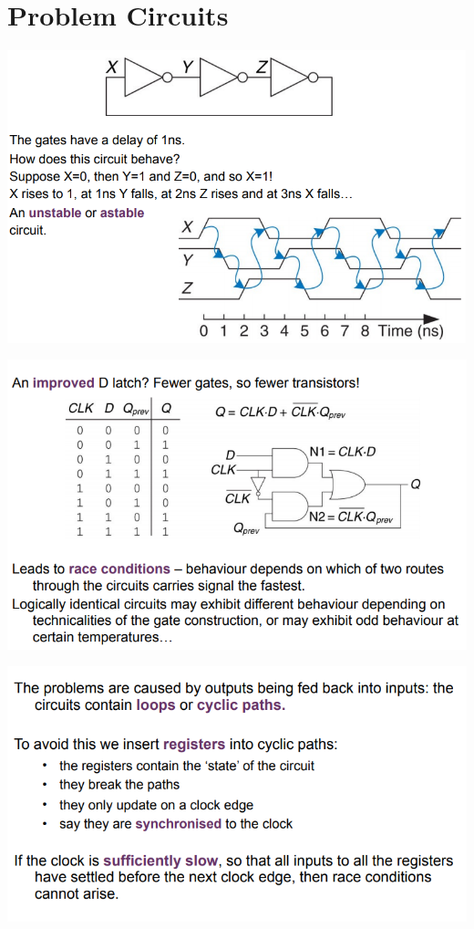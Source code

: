 \documentclass{article}[18pt]
\begin{document}
\section{Problem Circuits}
\begin{center}
	\includegraphics[scale=0.7]{figure11}
\end{center}
\begin{center}
	\includegraphics[scale=0.7]{figure12}
\end{center}
\begin{center}
	\includegraphics[scale=0.7]{figure13}
\end{center}
\end{document}
